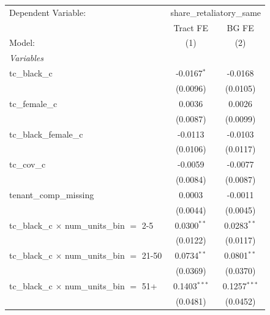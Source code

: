 \begingroup
\centering
\begin{tabular}{lcc}
   \tabularnewline \midrule \midrule
   Dependent Variable: & \multicolumn{2}{c}{share\_retaliatory\_same}\\
                                                         & Tract FE        & BG FE \\   
   Model:                                                & (1)             & (2)\\  
   \midrule
   \emph{Variables}\\
   tc\_black\_c                                          & -0.0167$^{*}$   & -0.0168\\   
                                                         & (0.0096)        & (0.0105)\\   
   tc\_female\_c                                         & 0.0036          & 0.0026\\   
                                                         & (0.0087)        & (0.0099)\\   
   tc\_black\_female\_c                                  & -0.0113         & -0.0103\\   
                                                         & (0.0106)        & (0.0117)\\   
   tc\_cov\_c                                            & -0.0059         & -0.0077\\   
                                                         & (0.0084)        & (0.0087)\\   
   tenant\_comp\_missing                                 & 0.0003          & -0.0011\\   
                                                         & (0.0044)        & (0.0045)\\   
   tc\_black\_c $\times$ num\_units\_bin $=$ 2-5         & 0.0300$^{**}$   & 0.0283$^{**}$\\   
                                                         & (0.0122)        & (0.0117)\\   
   tc\_black\_c $\times$ num\_units\_bin $=$ 21-50       & 0.0734$^{**}$   & 0.0801$^{**}$\\   
                                                         & (0.0369)        & (0.0370)\\   
   tc\_black\_c $\times$ num\_units\_bin $=$ 51+         & 0.1403$^{***}$  & 0.1257$^{***}$\\   
                                                         & (0.0481)        & (0.0452)\\   

\end{tabular}
